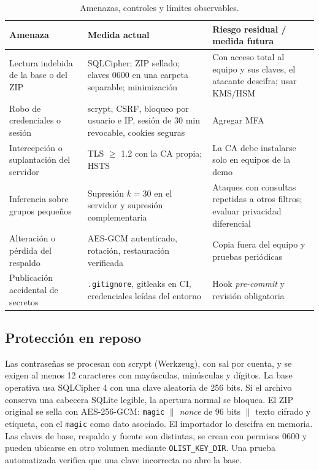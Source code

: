 \documentclass[12pt,a4paper]{article}
\begin{document}
\begin{table}[H]
\centering\footnotesize
\begin{tabularx}{\textwidth}{P{2.7cm}Y Y}
\toprule
Amenaza & Medida actual & Riesgo residual / medida futura\\
\midrule
Lectura indebida de la base o del ZIP & SQLCipher; ZIP sellado; claves 0600 en una carpeta separable; minimización & Con acceso total al equipo y sus claves, el atacante descifra; usar KMS/HSM\\
Robo de credenciales o sesión & scrypt, CSRF, bloqueo por usuario e IP, sesión de 30 min revocable, cookies seguras & Agregar MFA\\
Intercepción o suplantación del servidor & TLS $\geq$ 1.2 con la CA propia; HSTS & La CA debe instalarse solo en equipos de la demo\\
Inferencia sobre grupos pequeños & Supresión $k=30$ en el servidor y supresión complementaria & Ataques con consultas repetidas a otros filtros; evaluar privacidad diferencial\\
Alteración o pérdida del respaldo & AES-GCM autenticado, rotación, restauración verificada & Copia fuera del equipo y pruebas periódicas\\
Publicación accidental de secretos & \texttt{.gitignore}, gitleaks en CI, credenciales leídas del entorno & Hook \emph{pre-commit} y revisión obligatoria\\
\bottomrule
\end{tabularx}
\caption{Amenazas, controles y límites observables.}
\end{table}

\subsection{Protección en reposo}
Las contraseñas se procesan con scrypt (Werkzeug), con sal por cuenta, y se exigen al menos 12 caracteres con mayúsculas, minúsculas y dígitos. La base operativa usa SQLCipher 4 con una clave aleatoria de 256 bits. Si el archivo conserva una cabecera SQLite legible, la apertura normal se bloquea. El ZIP original se sella con AES-256-GCM: \texttt{magic} $\|$ \emph{nonce} de 96 bits $\|$ texto cifrado y etiqueta, con el \texttt{magic} como dato asociado. El importador lo descifra en memoria. Las claves de base, respaldo y fuente son distintas, se crean con permisos 0600 y pueden ubicarse en otro volumen mediante \texttt{OLIST\_KEY\_DIR}. Una prueba automatizada verifica que una clave incorrecta no abre la base.
\end{document}
